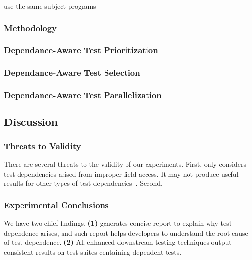 use the same subject programs

\subsubsection{Methodology}


\subsubsection{Dependance-Aware Test Prioritization}

\subsubsection{Dependance-Aware Test Selection}

\subsubsection{Dependance-Aware Test Parallelization}


\subsection{Discussion}

\subsubsection{Threats to Validity}

There are several threats to the validity
of our experiments. First, \dtexplain 
only considers test dependencies arised
from improper field access. It may not
produce useful results for other types of
test dependencies~\cite{}. Second,

\subsubsection{Experimental Conclusions}

We have two chief findings. \textbf{(1)} \dtexplain
generates concise report to explain why
test dependence arises, and such report
helps developers to understand the root cause
of test dependence. \textbf{(2)} All
enhanced downstream testing techniques
output consistent results on test suites
containing dependent tests.
